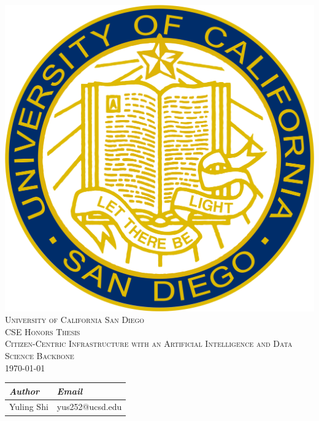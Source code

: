 \documentclass{ucsdreport}
\def\course{CSE Honors Thesis}      %
\def\thetitle{Citizen-Centric Infrastructure with an 
            Artificial Intelligence and Data Science
            Backbone}               %
\def\date{\today}                         %
\begin{document}
\begin{center}
    \vspace*{1.5cm}
    \includegraphics[scale = 0.10]{UCSDseal.png}\\[1.75cm]
    \textsc{\color[RGB]{0, 51, 102}\LARGE{University of California San Diego}}\\[1cm]
    \textsc{\Large{\course}}\\[.5cm]
    \textsc{\Large{\thetitle}}\\[.5cm]
    \textsc{\date}\\[2cm]
    \Large{
    \begin{tabular}{L{4cm} R{4cm}}
        \textit{Author} &  \textit{Email}\\
        \hline
        Yuling Shi & yus252@ucsd.edu \\
    \end{tabular}
    }
\end{center}
\thispagestyle{empty}
\pagebreak

\tableofcontents{}
\pagebreak

\end{document}
